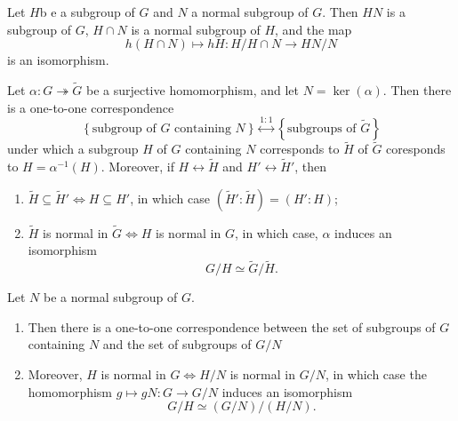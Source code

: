 \begin{theorem}
  \label{theorem-isomorphism}
  Let \( H \)b e a subgroup of \( G \) and \( N \) a normal subgroup of \( G \).
  Then \( HN \) is a subgroup of \( G \), \( H \cap N \) is a normal subgroup of \( H \), and the map
  \[
    h(H \cap N) \mapsto hH: H / H \cap N \to HN / N
  \]
  is an isomorphism.
\end{theorem}

\begin{theorem}
  \label{theorem-correspondence}
  Let \( \alpha: G \twoheadrightarrow \widetilde{G} \) be a surjective homomorphism, and let \( N = \ker(\alpha) \).
  Then there is a one-to-one correspondence
  \[
    \left\lbrace \text{subgroup of } G \text{ containing }N \right\rbrace \mathop{\leftrightarrow}\limits^{1:1} \left\lbrace \text{subgroups of } \widetilde{G} \right\rbrace
  \]
  under which a subgroup \( H \) of \( G \) containing \( N \) corresponds to \( \widetilde{H} \) of \( \widetilde{G} \) coresponds to \( H = \alpha^{-1}(H) \).
  Moreover, if \( H \leftrightarrow \widetilde{H} \) and \( H' \leftrightarrow \widetilde{H}' \), then
  \begin{enumerate}
    \item \( \widetilde{H} \subseteq \widetilde{H}' \iff H \subseteq H' \), in which case \( (\widetilde{H}': \widetilde{H}) = (H' : H) \);
    \item \( \widetilde{H} \) is normal in \( \widetilde{G} \iff H \) is normal in \( G \), in which case, \( \alpha \) induces an isomorphism
      \[
        G / H \simeq \widetilde{G} / \widetilde{H}.
      \]
  \end{enumerate}
\end{theorem}

\begin{corollary}
  \label{corollary-correspondence}
  Let \( N \) be a normal subgroup of \( G \).
  \begin{enumerate}
    \item Then there is a one-to-one correspondence between the set of subgroups of \( G \) containing \( N \) and the set of subgroups of \( G / N \)
    \item Moreover, \( H \) is normal in \( G \iff H / N \) is normal in \( G / N \), in which case the homomorphism \( g \mapsto gN: G \to G / N \) induces an isomorphism
      \[
        G / H \simeq (G / N) / (H / N).
      \]
  \end{enumerate}
\end{corollary}

